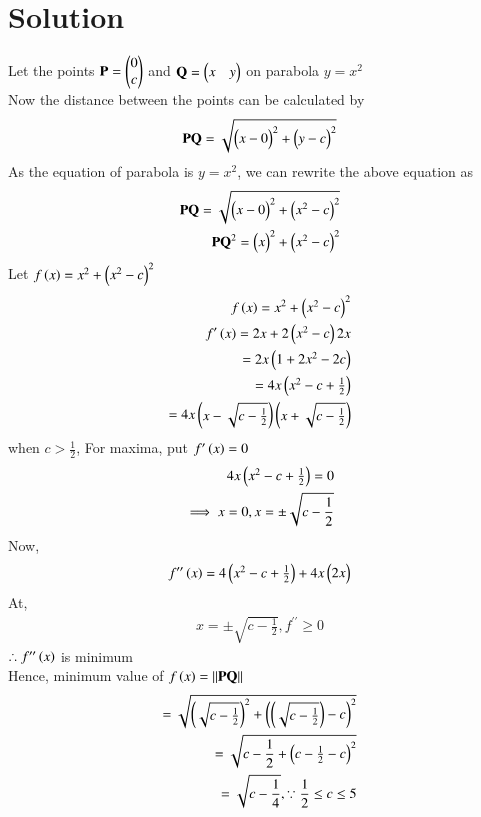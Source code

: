 \documentclass[journal,12pt,twocolumn]{IEEEtran}
\newcommand{\norm}[1]{\left\lVert#1\right\rVert}
\begin{document}
\section{Solution}
Let the points $\mathbf{P} =\begin{pmatrix}0\\c\end{pmatrix}$ and $\mathbf{Q} =\begin{pmatrix}x&y\end{pmatrix}$ on parabola $y=x^2$
\\Now the distance between the points can be calculated by
\begin{align}
  \mathbf{P}\mathbf{Q}=\sqrt{\begin{pmatrix}x-0\end{pmatrix}^2+\begin{pmatrix}y-c\end{pmatrix}^2} 
\end{align}
As the equation of parabola is $y=x^2$, we can rewrite the above equation as
 \begin{align}
      \mathbf{P}\mathbf{Q}=\sqrt{\begin{pmatrix}x-0\end{pmatrix}^2+\begin{pmatrix}x^2-c\end{pmatrix}^2}\\
      \mathbf{P}\mathbf{Q}^2=\begin{pmatrix}x\end{pmatrix}^2+\begin{pmatrix}x^2-c\end{pmatrix}^2
 \end{align}
Let $f \left(x\right) = x^2+\begin{pmatrix}x^2-c\end{pmatrix}^2$ 
\begin{align}
    f \left(x\right) = x^2+\begin{pmatrix}x^2-c\end{pmatrix}^2\\
    f^\prime \left(x\right) =2x+2\begin{pmatrix}x^2-c\end{pmatrix}2x\\
    =2x\begin{pmatrix}1+2x^2-2c\end{pmatrix}\\
     =4x\begin{pmatrix}x^2-c+\frac{1}{2}\end{pmatrix}\\
     =4x\begin{pmatrix}x-\sqrt{c-\frac{1}{2}}\end{pmatrix}\begin{pmatrix}x+\sqrt{c-\frac{1}{2}}\end{pmatrix}
\end{align}
when $c>\frac{1}{2}$,
For maxima, put $f^\prime \left(x\right) =0$
\begin{align}
   4x\begin{pmatrix}x^2-c+\frac{1}{2}\end{pmatrix}=0 \\
   \implies x=0, x=\pm \sqrt{c-\frac{1}{2}}
\end{align}
Now,
\begin{align}
   f^{\prime\prime} \left(x\right) =4\begin{pmatrix}x^2-c+\frac{1}{2}\end{pmatrix}+4x\begin{pmatrix}2x\end{pmatrix}
\end{align}
At,
\begin{align}
    x =\pm \sqrt{c-\frac{1}{2}} , f^{\prime\prime}\geq 0
\end{align}
$\therefore f^{\prime\prime} \left(x\right) $ is minimum\\
Hence, minimum value of $f \brak x =\norm{\vec{P}\vec{Q}}$
\begin{align}
   = \sqrt{\begin{pmatrix}\sqrt{c-\frac{1}{2}}\end{pmatrix}^2+\begin{pmatrix}\begin{pmatrix}\sqrt{c-\frac{1}{2}}\end{pmatrix}-c\end{pmatrix}^2}\\
   = \sqrt{c-\frac{1}{2}+\begin{pmatrix}c-\frac{1}{2}-c\end{pmatrix}^2}\\
    =\sqrt{c-\frac{1}{4}} , \because \frac{1}{2}\leq c \leq 5 
    \end{align}
\end{document}
